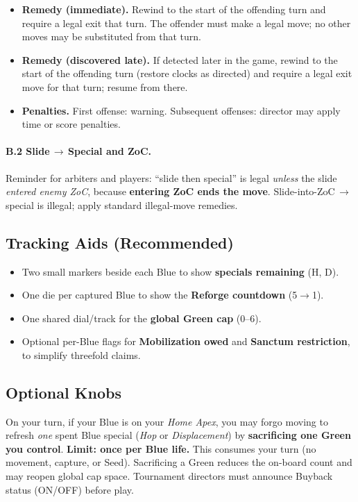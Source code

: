 \documentclass[11pt]{article}
\begin{document}
\begin{itemize}[leftmargin=1.3em,itemsep=0.2em]
  \item \textbf{Remedy (immediate).} Rewind to the start of the offending turn and require a legal exit that turn. The offender must make a legal move; no other moves may be substituted from that turn.
  \item \textbf{Remedy (discovered late).} If detected later in the game, rewind to the start of the offending turn (restore clocks as directed) and require a legal exit move for that turn; resume from there.
  \item \textbf{Penalties.} First offense: warning. Subsequent offenses: director may apply time or score penalties.
\end{itemize}

\paragraph{B.2 Slide\,$\to$\,Special and ZoC.}
Reminder for arbiters and players: “slide then special” is legal \emph{unless} the slide \emph{entered enemy ZoC}, because \textbf{entering ZoC ends the move}. Slide-into-ZoC\,$\to$\,special is illegal; apply standard illegal-move remedies.

\medskip
\subsection{Tracking Aids (Recommended)}

\begin{itemize}[leftmargin=1.3em,itemsep=0.2em]
  \item Two small markers beside each Blue to show \textbf{specials remaining} (H, D).
  \item One die per captured Blue to show the \textbf{Reforge countdown} (5$\to$1).
  \item One shared dial/track for the \textbf{global Green cap} (0–6).
  \item Optional per-Blue flags for \textbf{Mobilization owed} and \textbf{Sanctum restriction}, to simplify threefold claims.
\end{itemize}

\medskip
\subsection{Optional Knobs}

\begin{rulevariant}[title={Crown Buyback (Optional)}]
On your turn, if your Blue is on your \emph{Home Apex}, you may forgo moving to
refresh \emph{one} spent Blue special (\emph{Hop} or \emph{Displacement}) by
\textbf{sacrificing one Green you control}. \textbf{Limit: once per Blue life.}
This consumes your turn (no movement, capture, or Seed). Sacrificing a Green
reduces the on-board count and may reopen global cap space. Tournament directors
must announce Buyback status (ON/OFF) before play.
\end{rulevariant}
\end{document}
